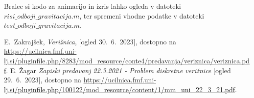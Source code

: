 \documentclass{article}
\begin{document}
Bralec si kodo za animacijo in izris lahko ogleda v datoteki $risi\_odboji\_gravitacija.m$, ter spremeni vhodne podatke v datoteki $test\_odboji\_gravitacija.m$.


\begin{thebibliography}{9}
        E.~Zakrajšek, \emph{Verižnica}, [ogled 30.~6.~2023], dostopno na \url{https://ucilnica.fmf.uni-lj.si/pluginfile.php/8283/mod_resource/conte4/predavanja/veriznica/veriznica.pdf}.
        E. Žagar \emph{Zapiski predavanj 22.3.2021 - Problem diskretne verižnice} [ogled 29.~6.~2023], dostopno na \url{https://ucilnica.fmf.uni-lj.si/pluginfile.php/100122/mod_resource/content/1/mm_uni_22_3_21.pdf}.
\end{thebibliography}
\end{document}
